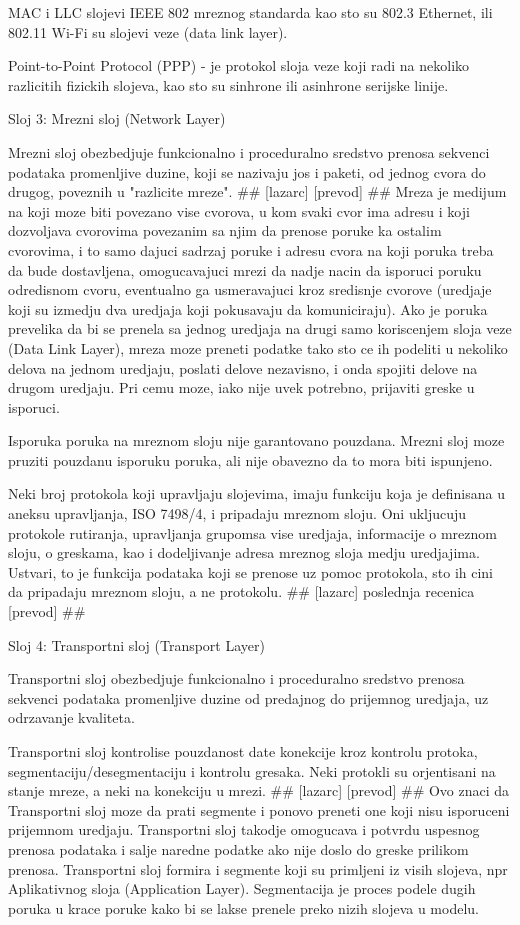 \documentclass[a4paper,12pt, master]{etf}
\begin{document}
	MAC i LLC slojevi IEEE 802 mreznog standarda kao sto su 802.3 Ethernet, ili 802.11 Wi-Fi su
	slojevi veze (data link layer).

	Point-to-Point Protocol (PPP) - je protokol sloja veze koji radi na nekoliko razlicitih
	fizickih slojeva, kao sto su sinhrone ili asinhrone serijske linije.

	Sloj 3: Mrezni sloj (Network Layer)

	Mrezni sloj obezbedjuje funkcionalno i proceduralno sredstvo prenosa sekvenci podataka
	promenljive duzine, koji se nazivaju jos i paketi, od jednog cvora do drugog, poveznih u
	"razlicite mreze". \#\# [lazarc] [prevod] \#\# Mreza je medijum na koji moze biti povezano vise
	cvorova, u kom svaki cvor ima adresu i koji dozvoljava cvorovima povezanim sa njim da prenose
	poruke ka ostalim cvorovima, i to samo dajuci sadrzaj poruke i adresu cvora na koji poruka
	treba da bude dostavljena, omogucavajuci mrezi da nadje nacin da isporuci poruku odredisnom
	cvoru, eventualno ga usmeravajuci kroz sredisnje cvorove (uredjaje koji su izmedju dva uredjaja
	koji pokusavaju da komuniciraju). Ako je poruka prevelika da bi se prenela sa jednog uredjaja
	na drugi samo koriscenjem sloja veze (Data Link Layer), mreza moze preneti podatke tako sto ce
	ih podeliti u nekoliko delova na jednom uredjaju, poslati delove nezavisno, i onda spojiti
	delove na drugom uredjaju. Pri cemu moze, iako nije uvek potrebno, prijaviti greske u isporuci.

	Isporuka poruka na mreznom sloju nije garantovano pouzdana. Mrezni sloj moze pruziti pouzdanu
	isporuku poruka, ali nije obavezno da to mora biti ispunjeno.

	Neki broj protokola koji upravljaju slojevima, imaju funkciju koja je definisana u aneksu
	upravljanja, ISO 7498/4, i pripadaju mreznom sloju. Oni ukljucuju protokole rutiranja,
	upravljanja grupomsa vise uredjaja, informacije o mreznom sloju, o greskama, kao i dodeljivanje
	adresa mreznog sloja medju uredjajima. Ustvari, to je funkcija podataka koji se prenose uz
	pomoc protokola, sto ih cini da pripadaju mreznom sloju, a ne protokolu. \#\# [lazarc] poslednja
	recenica [prevod] \#\#

	Sloj 4: Transportni sloj (Transport Layer)

	Transportni sloj obezbedjuje funkcionalno i proceduralno sredstvo prenosa sekvenci podataka
	promenljive duzine od predajnog do prijemnog uredjaja, uz odrzavanje kvaliteta.

	Transportni sloj kontrolise pouzdanost date konekcije kroz kontrolu protoka,
	segmentaciju/desegmentaciju i kontrolu gresaka. Neki protokli su orjentisani na stanje mreze, a
	neki na konekciju u mrezi. \#\# [lazarc] [prevod] \#\# Ovo znaci da Transportni sloj moze da prati
	segmente i ponovo preneti one koji nisu isporuceni prijemnom uredjaju. Transportni sloj takodje
	omogucava i potvrdu uspesnog prenosa podataka i salje naredne podatke ako nije doslo do greske
	prilikom prenosa. Transportni sloj formira i segmente koji su primljeni iz visih slojeva, npr
	Aplikativnog sloja (Application Layer). Segmentacija je proces podele dugih poruka u krace
	poruke kako bi se lakse prenele preko nizih slojeva u modelu.
\end{document}
